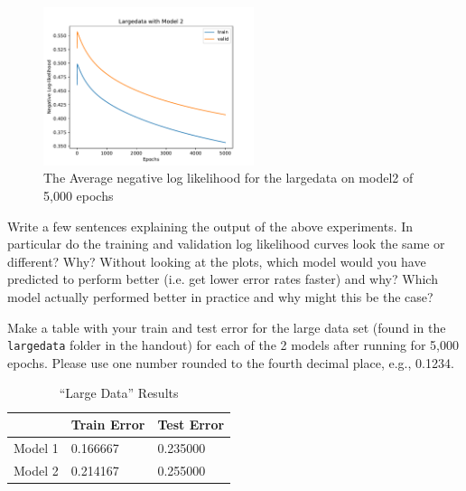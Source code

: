 \documentclass[11pt,addpoints,answers]{exam}
\begin{document}
\begin{questions}
\begin{your_solution}[height=8cm]
    
\begin{figure}[H]
    \centering
    \includegraphics[width = 0.55\textwidth]{./images/l_model2_5000eps.pdf}
    \caption{The Average negative log likelihood for the largedata on model2 of 5,000 epochs}
    \label{fig2}
\end{figure}
    
\begin{center}
\end{center}
\end{your_solution}

    

\clearpage

\question[2]
Write a few sentences explaining the output of the above experiments. In particular do the training and validation log likelihood curves look the same or different? Why?
Without looking at the plots, which model would you have predicted to perform better (i.e. get lower error rates faster) and why? Which model actually performed better in practice and why might this be the case? 

\begin{your_solution}[height=8.5cm]
\end{your_solution}

\question[2]
Make a table with your train and test error for the large data set (found in the \texttt{largedata} folder in the handout) for each of the 2 models after running for 5,000 epochs. Please use one number rounded to the  fourth decimal place, e.g., 0.1234.

\begin{your_solution}[height=6cm]
 \begin{table}[H]
    \centering
    \begin{tabular}{l|l|l}
    \toprule
    & Train Error & Test Error \\ 
    \midrule
    Model 1 & 0.166667 & 0.235000 \\ 
    Model 2 & 0.214167 & 0.255000 \\ 
    \bottomrule
    \end{tabular}
    \caption{``Large Data'' Results}
    \label{results}
\end{table}
\end{your_solution}





\end{questions}
\end{document}
